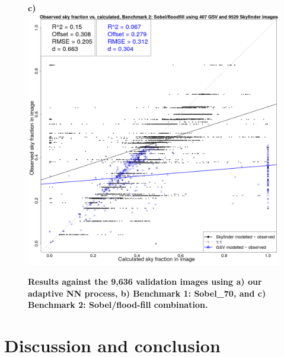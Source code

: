 \documentclass[final,3p,times,authoryear]{elsarticle}
\begin{document}
\begin{figure}
\textbf{c)}\includegraphics[scale=0.15]{Images/ErrorPlots2FloodfillValidation.png}
\caption{\textbf{
Results against the 9,636 validation images using a) our adaptive NN process, b) Benchmark 1: Sobel\_70, and c) Benchmark 2: Sobel/flood-fill combination.}}
\label{fig:errorfloodall}
\end{figure}





\section{Discussion and conclusion}\label{sec:conclusion}
\end{document}
